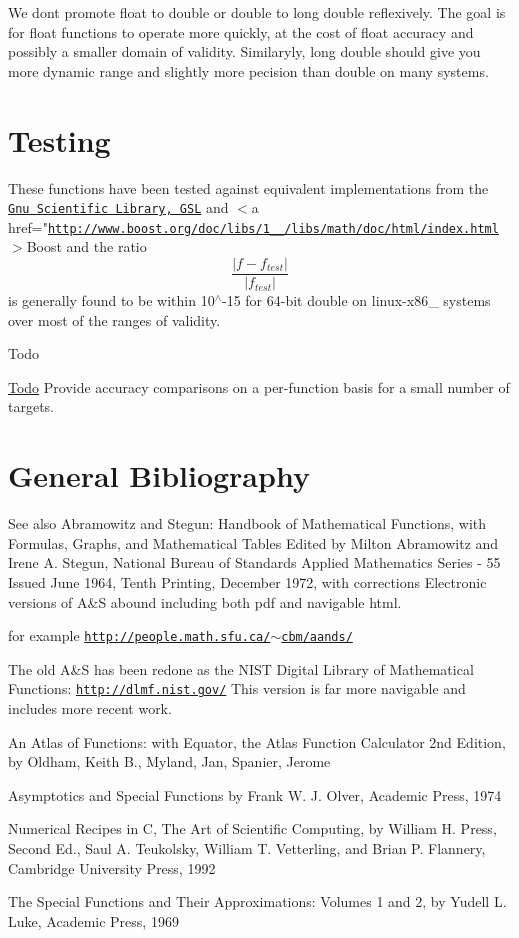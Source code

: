 We don\textquotesingle{}t promote {\ttfamily float} to {\ttfamily double} or {\ttfamily double} to {\ttfamily long double} reflexively. The goal is for {\ttfamily float} functions to operate more quickly, at the cost of {\ttfamily float} accuracy and possibly a smaller domain of validity. Similaryly, {\ttfamily long double} should give you more dynamic range and slightly more pecision than {\ttfamily double} on many systems.\hypertarget{index_testing}{}\section{Testing}\label{index_testing}
These functions have been tested against equivalent implementations from the \href{http://www.gnu.org/software/gsl}{\tt Gnu Scientific Library, G\+SL} and $<$a href="\href{http://www.boost.org/doc/libs/1_60_0/libs/math/doc/html/index.html}{\tt http\+://www.\+boost.\+org/doc/libs/1\+\_\+\_/libs/math/doc/html/index.\+html}$>$Boost and the ratio \[ \frac{|f - f_{test}|}{|f_{test}|} \] is generally found to be within 10$^\wedge$-\/15 for 64-\/bit double on linux-\/x86\+\_ systems over most of the ranges of validity.

\begin{DoxyRefDesc}{Todo}
\item[\hyperlink{todo__todo000001}{Todo}]Provide accuracy comparisons on a per-\/function basis for a small number of targets.\end{DoxyRefDesc}
\hypertarget{index_bibliography}{}\section{General Bibliography}\label{index_bibliography}
\begin{DoxySeeAlso}{See also}
Abramowitz and Stegun\+: Handbook of Mathematical Functions, with Formulas, Graphs, and Mathematical Tables Edited by Milton Abramowitz and Irene A. Stegun, National Bureau of Standards Applied Mathematics Series -\/ 55 Issued June 1964, Tenth Printing, December 1972, with corrections Electronic versions of A\&S abound including both pdf and navigable html. 

for example \href{http://people.math.sfu.ca/~cbm/aands/}{\tt http\+://people.\+math.\+sfu.\+ca/$\sim$cbm/aands/}

The old A\&S has been redone as the N\+I\+ST Digital Library of Mathematical Functions\+: \href{http://dlmf.nist.gov/}{\tt http\+://dlmf.\+nist.\+gov/} This version is far more navigable and includes more recent work.

An Atlas of Functions\+: with Equator, the Atlas Function Calculator 2nd Edition, by Oldham, Keith B., Myland, Jan, Spanier, Jerome

Asymptotics and Special Functions by Frank W. J. Olver, Academic Press, 1974

Numerical Recipes in C, The Art of Scientific Computing, by William H. Press, Second Ed., Saul A. Teukolsky, William T. Vetterling, and Brian P. Flannery, Cambridge University Press, 1992

The Special Functions and Their Approximations\+: Volumes 1 and 2, by Yudell L. Luke, Academic Press, 1969 
\end{DoxySeeAlso}
